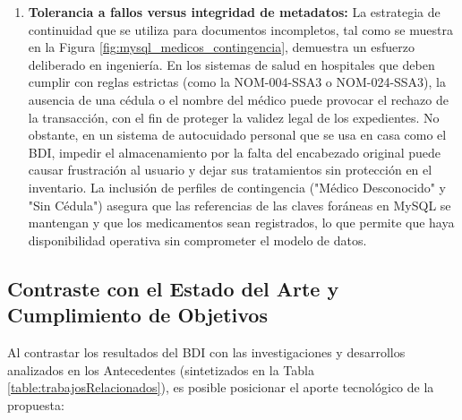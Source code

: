 \begin{enumerate}
    \item \textbf{Tolerancia a fallos versus integridad de metadatos:} La estrategia de continuidad que se utiliza para documentos incompletos, tal como se muestra en la Figura \ref{fig:mysql_medicos_contingencia}, demuestra un esfuerzo deliberado en ingeniería. En los sistemas de salud en hospitales que deben cumplir con reglas estrictas (como la NOM-004-SSA3 o NOM-024-SSA3), la ausencia de una cédula o el nombre del médico puede provocar el rechazo de la transacción, con el fin de proteger la validez legal de los expedientes. No obstante, en un sistema de autocuidado personal que se usa en casa como el {BDI}, impedir el almacenamiento por la falta del encabezado original puede causar frustración al usuario y dejar sus tratamientos sin protección en el inventario. La inclusión de perfiles de contingencia ("Médico Desconocido" y "Sin Cédula") asegura que las referencias de las claves foráneas en {MySQL} se mantengan y que los medicamentos sean registrados, lo que permite que haya disponibilidad operativa sin comprometer el modelo de datos.
\end{enumerate}

\subsection{Contraste con el Estado del Arte y Cumplimiento de Objetivos}
\label{subsec:discusion_estado_arte}

Al contrastar los resultados del {BDI} con las investigaciones y desarrollos analizados en los Antecedentes (sintetizados en la Tabla \ref{table:trabajosRelacionados}), es posible posicionar el aporte tecnológico de la propuesta:

